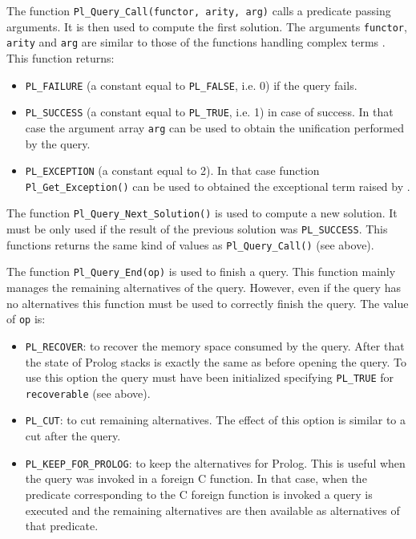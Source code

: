 The function \texttt{Pl\_Query\_Call(functor, arity, arg)} calls a predicate
passing arguments. It is then used to compute the first solution. The
arguments \texttt{functor}, \texttt{arity} and \texttt{arg} are similar to
those of the functions handling complex terms
. This function returns:

\begin{itemize}

\item \texttt{PL\_FAILURE} (a constant equal to \texttt{PL\_FALSE}, i.e. 0) if
the query fails.

\item \texttt{PL\_SUCCESS} (a constant equal to \texttt{PL\_TRUE}, i.e. 1) in
case of success. In that case the argument array \texttt{arg} can be used to
obtain the unification performed by the query.

\item \texttt{PL\_EXCEPTION} (a constant equal to 2). In that case function
\texttt{Pl\_Get\_Exception()} can be used to obtained the exceptional term
raised by  .

\end{itemize}

The function \texttt{Pl\_Query\_Next\_Solution()} is used to compute a new
solution. It must be only used if the result of the previous solution was
\texttt{PL\_SUCCESS}. This functions returns the same kind of values as
\texttt{Pl\_Query\_Call()} (see above).

The function \texttt{Pl\_Query\_End(op)} is used to finish a query. This
function mainly manages the remaining alternatives of the query. However,
even if the query has no alternatives this function must be used to
correctly finish the query. The value of \texttt{op} is:

\begin{itemize}

\item \texttt{PL\_RECOVER}: to recover the memory space consumed by the
query. After that the state of Prolog stacks is exactly the same as before
opening the query. To use this option the query must have been initialized
specifying \texttt{PL\_TRUE} for \texttt{recoverable} (see above).

\item \texttt{PL\_CUT}: to cut remaining alternatives. The effect of this
option is similar to a cut after the query.

\item \texttt{PL\_KEEP\_FOR\_PROLOG}: to keep the alternatives for Prolog.
This is useful when the query was invoked in a foreign C function. In that
case, when the predicate corresponding to the C foreign function is invoked
a query is executed and the remaining alternatives are then available as
alternatives of that predicate.

\end{itemize}

